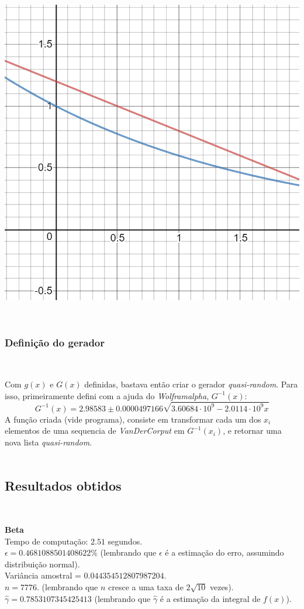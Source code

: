 \documentclass[pt12]{article}
\begin{document}
\begin{center}\includegraphics[scale=0.3]{desmos-graph(1).png}\end{center}
\ 

\subsubsection{Definição do gerador}
\

Com $g(x)$ e $G(x)$ definidas, bastava então criar o gerador \textit{quasi-random}. Para isso, primeiramente defini com a ajuda do \textit{Wolframalpha}, $G^{-1}(x)$:
$$G^{-1}(x) = 2.98583 \pm 0.0000497166\sqrt{3.60684\cdot 10^9 - 2.0114\cdot 10^9x}$$
A função criada (vide programa), consiste em transformar cada um dos $x_i$ elementos de uma sequencia de \textit{VanDerCorput} em $G^{-1}(x_i)$, e retornar uma nova lista \textit{quasi-random}.\\
\ 

\subsection{Resultados obtidos}
\ 

\textbf{Beta}\\
\noindent Tempo de computação: $2.51$ segundos.\\
\noindent $\epsilon = 0.4681088501408622\%$ (lembrando que $\epsilon$ é a estimação do erro, assumindo distribuição normal).\\
\noindent Variância amostral = $0.044354512807987204$.\\
\noindent $n = 7776$. (lembrando que $n$ cresce a uma taxa de $2\sqrt{10}$ vezes).\\
\noindent $\hat{\gamma} = 0.7853107345425413$ (lembrando que $\hat{\gamma}$ é a estimação da integral de $f(x)$).\\
\ 
\end{document}
